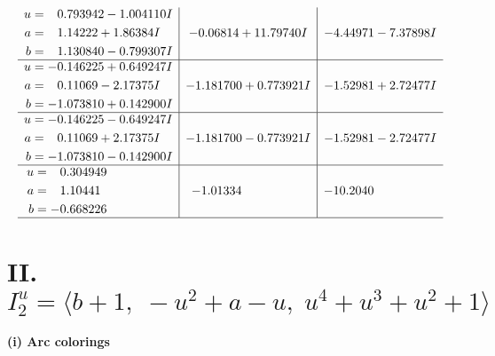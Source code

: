 \documentclass[1p]{elsarticle_modified}
\theoremstyle{definition}
\begin{document}
$$\begin{array}{c|c|c}
\begin{aligned}
u &= \phantom{-}0.793942 - 1.004110 I \\
a &= \phantom{-}1.14222 + 1.86384 I \\
b &= \phantom{-}1.130840 - 0.799307 I\end{aligned}
 & -0.06814 + 11.79740 I & -4.44971 - 7.37898 I \\ \hline\begin{aligned}
u &= -0.146225 + 0.649247 I \\
a &= \phantom{-}0.11069 - 2.17375 I \\
b &= -1.073810 + 0.142900 I\end{aligned}
 & -1.181700 + 0.773921 I & -1.52981 + 2.72477 I \\ \hline\begin{aligned}
u &= -0.146225 - 0.649247 I \\
a &= \phantom{-}0.11069 + 2.17375 I \\
b &= -1.073810 - 0.142900 I\end{aligned}
 & -1.181700 - 0.773921 I & -1.52981 - 2.72477 I \\ \hline\begin{aligned}
u &= \phantom{-}0.304949\phantom{ +0.000000I} \\
a &= \phantom{-}1.10441\phantom{ +0.000000I} \\
b &= -0.668226\phantom{ +0.000000I}\end{aligned}
 & -1.01334\phantom{ +0.000000I} & -10.2040\phantom{ +0.000000I}\\
 \hline 
 \end{array}$$\newpage\newpage\renewcommand{\arraystretch}{1}
\centering \section*{II. $I^u_{2}= \langle b+1,\;- u^2+a- u,\;u^4+u^3+u^2+1 \rangle$}
\flushleft \textbf{(i) Arc colorings}\\
\end{document}
